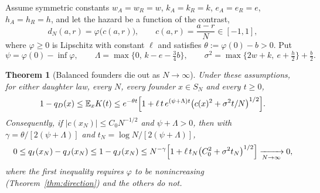 \documentclass[11pt]{article}
\newtheorem{theorem}{Theorem}
\theoremstyle{remark}
\newcommand{\E}{\mathbb E}
\begin{document}
Assume symmetric constants $w_A=w_R=w$, $k_A=k_R=k$, $e_A=e_R=e$,
$h_A=h_R=h$, and let the hazard be a function of the contrast,
\[
 d_N(a,r)=\varphi\bigl(c(a,r)\bigr),\qquad c(a,r)=\frac{a-r}N\in[-1,1],
\]
where $\varphi\ge0$ is Lipschitz with constant $\ell$ and satisfies
$\theta:=\varphi(0)-b>0$. Put
\[
 \psi=\varphi(0)-\inf\varphi,\qquad\Lambda=\max\{0,\,k-e-\tfrac34b\},\qquad
 \sigma^2=\max\{2w+k,\ e+\tfrac h2\}+\tfrac b2 .
\]

\begin{theorem}[Balanced founders die out as $N\to\infty$]\label{thm:boundary}
Under these assumptions, for either daughter law, every $N$, every founder
$x\in S_N$ and every $t\ge0$,
\begin{equation}\label{eq:fmbound}
 1-q_D(x)\le\E_xK(t)\le e^{-\theta t}\Bigl[1+\ell\,t\,e^{(\psi+\Lambda)t}\bigl(c(x)^2+\sigma^2t/N\bigr)^{1/2}\Bigr].
\end{equation}
Consequently, if $|c(x_N)|\le C_0N^{-1/2}$ and $\psi+\Lambda>0$, then with
$\gamma=\theta/[2(\psi+\Lambda)]$ and $t_N=\log N/[2(\psi+\Lambda)]$,
\begin{equation}\label{eq:rate}
 0\le q_I(x_N)-q_J(x_N)\le1-q_J(x_N)\le N^{-\gamma}\Bigl[1+\ell\,t_N\bigl(C_0^2+\sigma^2t_N\bigr)^{1/2}\Bigr]\xrightarrow[N\to\infty]{}0,
\end{equation}
where the first inequality requires $\varphi$ to be nonincreasing
\textup{(}Theorem~\ref{thm:direction}\textup{)} and the others do not.
\end{theorem}
\end{document}
